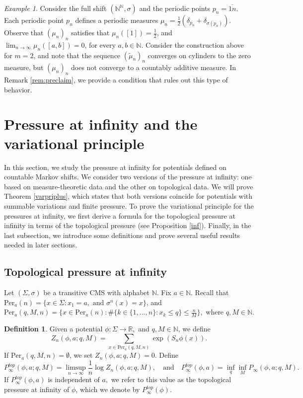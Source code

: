 \documentclass[letterpaper,11pt]{amsart}
\theoremstyle{plain}
\theoremstyle{plain}
\theoremstyle{definition}
\newtheorem{definition}{Definition}[subsection]
\theoremstyle{remark}
\newtheorem{example}{Example}
\def\R{{\mathbb R}}
\def\N{{\mathbb N}}
\begin{document}
\begin{example}\label{counter} Consider the full shift $(\N^\N,\sigma)$ and the periodic points $p_n=\overline{1n}$. Each periodic point $p_n$ defines a periodic measures $\mu_n=\frac{1}{2}(\delta_{p_n}+\delta_{\sigma(p_n)})$. Observe that $(\mu_n)_n$ satisfies that $\mu_n([1])=\frac{1}{2}$, and  $\lim_{n\to\infty}\mu_n([a,b])=0$, for every $a,b\in \N$. Consider the construction above for $m=2$, and note that the sequence $(\tilde{\mu}_n)_n$ converges on cylinders to the zero measure, but $(\mu_n)_n$ does not converge to a countably additive measure. In Remark \ref{rem:preclaim}, we provide a condition that rules out this type of behavior.
\end{example}






\section{Pressure at infinity and the variational principle}\label{secpre}
In this section, we study the pressure at infinity for potentials defined on countable Markov shifts. We consider two versions of the pressure at infinity: one based on measure-theoretic data and the other on topological data. We will prove Theorem \ref{varpriplus}, which states that both versions coincide for potentials with summable variations and finite pressure. To prove the variational principle for the pressures at infinity, we first derive a formula for the topological pressure at infinity in terms of the topological pressure (see Proposition \ref{inf}). Finally, in the last subsection, we introduce some definitions and prove several useful results needed in later sections.

\subsection{Topological pressure at infinity}\label{subsec:presinf}
Let $(\Sigma,\sigma)$ be a transitive CMS with alphabet $\N$. Fix $a\in \N$. Recall that $\text{Per}_a(n)=\{x\in\Sigma:x_1=a,\text{ and }\sigma^n(x)=x\}$, and 
$\text{Per}_a(q,M,n)=\{x\in  \text{Per}_a(n): \#\{k\in\{1,...,n\}:x_k\le q\}\le \frac{n}{M}\},$ where $q,M\in\N$.

\begin{definition} Given a potential $\phi:\Sigma\to\R,$ and $q,M\in\N$, we define $$Z_n(\phi,a; q,M)=\sum_{x\in \text{Per}_a(q,M,n)}\exp(S_n\phi(x)).$$
 If $\text{Per}_a(q,M,n)=\emptyset$, we set $Z_n(\phi,a;q,M)=0$.  Define
$$P^{top}_\infty(\phi,a;q,M)=\limsup_{n\to\infty} \frac{1}{n}\log Z_n(\phi,a;q,M),\quad\text{and}\quad P^{top}_\infty(\phi,a)=\inf_q\inf_M P_\infty(\phi,a;q,M).$$
If $P^{top}_\infty(\phi,a)$ is independent of $a,$ we refer to this value as the topological pressure at infinity of $\phi$, which we denote by $P^{top}_\infty(\phi)$.
\end{definition}
\end{document}

